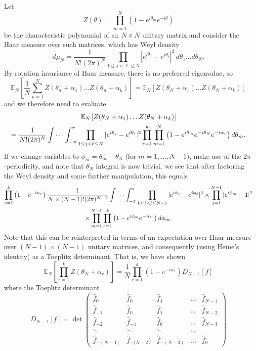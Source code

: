 \documentclass[12pt,a4paper,reqno]{amsart}
\theoremstyle{remark}
\numberwithin{equation}{section}
\newcommand{\E}{\mathbb{E}}
\begin{document}
Let
\[
Z(\theta) = \prod_{m=1}^N \left(1-e^{i \theta_m} e^{-i\theta}\right)
\]
be the characteristic polynomial of an $N \times N$ unitary matrix and consider the Haar measure over such matrices, which has Weyl density
\begin{equation}\label{eq:Weyl}
d\mu_N = \frac{1}{N! (2 \pi)^N} \prod_{1 \leq j < \ell \leq N} |e^{i\theta_j} - e^{i\theta_\ell}|^2 \ d\theta_1 \ldots d\theta_N.
\end{equation}
By rotation invariance of Haar measure, there is no preferred eigenvalue, so
\begin{equation*}
\E_N\left[\frac{1}{N} \sum_{n=1}^N Z(\theta_n+\alpha_1) \dots Z(\theta_n+\alpha_k)\right] = \E_N\left[ Z(\theta_N+\alpha_1) \dots Z(\theta_N+\alpha_k)\right]
\end{equation*}
and we therefore need to evaluate
\begin{multline*}
    \E_N\left[ Z(\theta_N+\alpha_1) \dots Z(\theta_N+\alpha_k)\right] \\
    = \frac{1}{N! (2 \pi)^N} \idotsint_{-\pi}^\pi \prod_{1 \leq j < \ell \leq N} |e^{i\theta_j} - e^{i\theta_\ell}|^2 \prod_{r=1}^k \prod_{m=1}^N \left(1-e^{i \theta_m} e^{-i\theta_N} e^{-i\alpha_r}\right)  d\theta_m.
\end{multline*}
If we change variables to $\phi_m = \theta_m-\theta_N$ (for $m=1,\dots,N-1$), make use of the $2\pi$-periodicity, and note that $\theta_N$ integral is now trivial, we see that after factoring the Weyl density and some further manipulation, this equals
\begin{multline*}
\prod_{r=1}^k \left(1-e^{-i\alpha_r}\right) \frac{1}{N \times (N-1)! (2 \pi)^{N-1}} \idotsint_{-\pi}^\pi \prod_{1 \leq j < \ell \leq N-1} |e^{i\phi_j} - e^{i\phi_\ell}|^2 \times \prod_{j=1}^{N-1} |e^{i\phi_m} - 1|^2 \\
\times\prod_{m=1}^{N-1} \prod_{r=1}^k\left(1-e^{i \phi_m} e^{-i\alpha_r} \right) d\phi_m.
\end{multline*}
Note that this can be reinterpreted in terms of an expectation over Haar measure over $(N-1)\times(N-1)$ unitary matrices, and consequently (using Heine's identity) as a Toeplitz determinant. That is, we have shown
\begin{equation}
\E_N\left[ \prod_{r=1}^k Z(\theta_N+\alpha_r) \right] = \frac{1}{N}\prod_{r=1}^k \left(1-e^{-i\alpha_r}\right) D_{N-1}[f] \label{eq:ShiftedCharPolyInTermsOfDN}
\end{equation}
where the Toeplitz determinant
\[
D_{N-1}[f] = \det  \begin{pmatrix}
	\widehat f_0 & \widehat f_0 &  \widehat f_1 &  \dots & \widehat f_{N-1} \\
	\widehat f_{-1} & \widehat f_0 &  \widehat f_1 &  \dots & \widehat f_{N-2} \\
	\widehat f_{-2} & \widehat f_{-1} &  \widehat f_0 &  \dots & \widehat f_{N-3} \\
	\ddots & \ddots & \ddots & \dots \\
	\widehat f_{-(N-1)} & \widehat f_{-(N-2})  & \widehat f_{-(N-3)} & \dots &  \widehat f_0
\end{pmatrix}
\]
\end{document}
